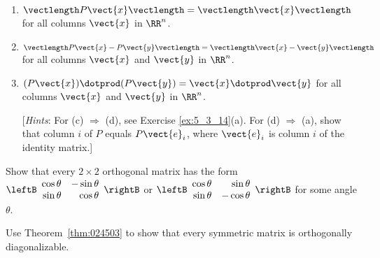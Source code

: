 \begin{multicols}{2}
\begin{ex}
\begin{enumerate}[label={\alph*.}]
\item $\vectlength P\vect{x}\vectlength = \vectlength\vect{x}\vectlength$ for all columns $\vect{x}$ in $\RR^n$.

\item $\vectlength P\vect{x} - P\vect{y}\vectlength = \vectlength\vect{x} - \vect{y}\vectlength$ for all columns $\vect{x}$ and $\vect{y}$ in $\RR^n$.

\item $(P\vect{x}) \dotprod (P\vect{y}) = \vect{x} \dotprod \vect{y}$ for all columns $\vect{x}$ and $\vect{y}$ in $\RR^n$.


[\textit{Hints}: For (c) $\Rightarrow$ (d), see Exercise \ref{ex:5_3_14}(a). For (d) $\Rightarrow$ (a), show that column $i$ of $P$ equals $P\vect{e}_{i}$, where $\vect{e}_{i}$ is column $i$ of the identity matrix.]

\end{enumerate}
\end{ex}



\begin{ex}
Show that every $2 \times 2$ orthogonal matrix has the form $\leftB \begin{array}{rr}
\cos\theta & -\sin\theta \\
\sin\theta & \cos\theta
\end{array}\rightB$ or $\leftB \begin{array}{rr}
\cos\theta & \sin\theta \\
\sin\theta & -\cos\theta
\end{array}\rightB$
 for some angle $\theta$. \newline [\textit{Hint}: If $a^{2} + b^{2} = 1$, then $a = \cos\theta$ and $b = \sin\theta$ for some angle $\theta$.]
\end{ex}

\begin{ex}
Use Theorem~\ref{thm:024503} to show that every symmetric matrix is orthogonally diagonalizable.
\end{ex}
\end{multicols}
